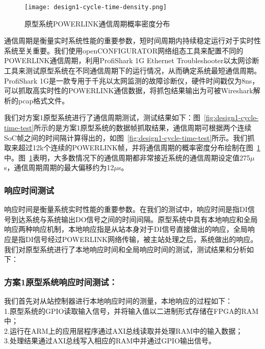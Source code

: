 \begin{figure}[!htb]
  \centering
  \texttt{[image: design1-cycle-time-density.png]}
  \caption{原型系统POWERLINK通信周期概率密度分布}
  \label{fig:design1-cycle-time-density}
\end{figure}

通信周期是衡量实时系统性能的重要参数，短时间周期内持续稳定运行对于实时性系统至关重要。我们使用openCONFIGURATOR网络组态工具来配置不同的POWERLINK通信周期，利用ProfiShark 1G Ethernet Troubleshooter以太网诊断工具来测试原型系统在不同通信周期下的运行情况，从而确定系统最短通信周期。ProfiShark 1G是一款专用于千兆以太网监测的故障诊断仪，硬件时间戳仅为8ns，可以抓取高实时性的POWERLINK通信数据，将抓包结果输出为可被Wireshark解析的pcap格式文件。

我们对方案1原型系统进行了通信周期测试，测试结果如下：图~\ref{fig:design1-cycle-time-test}所示的是方案1原型系统的数据帧抓取结果，通信周期可根据两个连续SoC帧之间的时间隔计算得出的，如图~\ref{fig:design1-cycle-time-test}所示。我们抓取来超过12k个连续的POWERLINK帧，并将通信周期的概率密度分布绘制在图~\ref{fig:design1-cycle-time-density}中。图~\ref{fig:design1-cycle-time-density}表明，大多数情况下的通信周期都非常接近系统的通信周期设定值275$\mu$s，通信周期周期的最大偏移约为12$\mu$s。


\subsubsection{响应时间测试}
响应时间是衡量系统实时性能的重要参数。在我们的测试中，响应时间是指DI信号到达系统与系统输出DO信号之间的时间间隔。原型系统中具有本地响应和全局响应两种响应机制，本地响应指是从站本身对于DI信号直接做出的响应，全局响应是指DI信号经过POWERLINK网络传输，被主站处理之后，系统做出的响应。我们对原型系统进行了本地响应时间和全局响应时间的测试，测试结果和分析如下：

\subsubsection{方案1原型系统响应时间测试：}

我们首先对从站控制器进行本地响应时间的测量，本地响应的过程如下：\\
1.原型系统的GPIO读取输入信号，并将输入值以二进制形式存储在FPGA的RAM中；\\
2.运行在ARM上的应用层程序通过AXI总线读取并处理RAM中的输入数据；\\
3.处理结果通过AXI总线写入相应的RAM中并通过GPIO输出信号。\\


